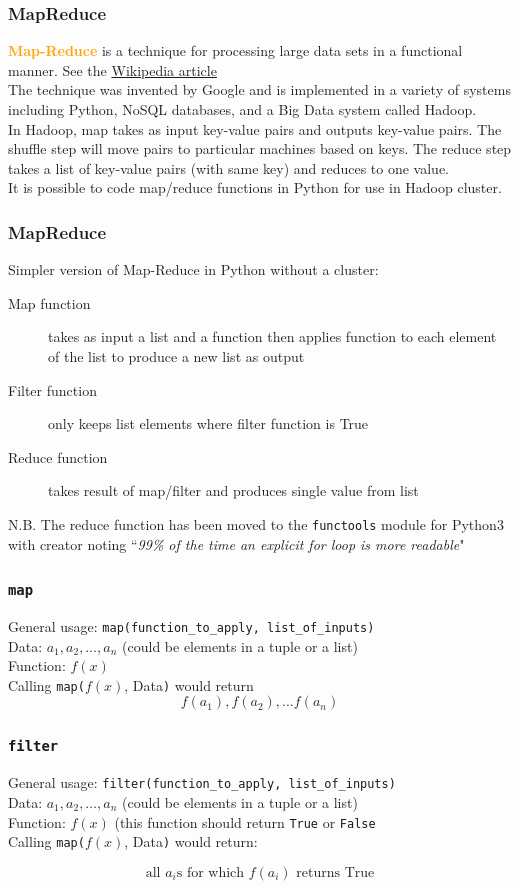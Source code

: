 \documentclass[xcolor=svgnames]{beamer}
\newcommand{\nl}{\\[1em]}
\newcommand{\define}[1]{\textbf{\textcolor{orange}{#1}}}
\newcommand{\ft}[1]{\frametitle{#1}}
\begin{document}
\begin{frame}[fragile]\ft{MapReduce}
\define{Map-Reduce} is a technique for processing large data sets in a functional manner. See the \href{https://en.wikipedia.org/wiki/MapReduce}{Wikipedia article}\nl
The technique was invented by Google and is implemented in a variety of systems including Python, NoSQL databases, and a Big Data system called Hadoop.\nl
In Hadoop, map takes as input key-value pairs and outputs key-value pairs.  The shuffle step will move pairs to particular machines based on keys.  The reduce step takes a list of key-value pairs (with same key) and reduces to one value.\nl
It is possible to code map/reduce functions in Python for use in Hadoop cluster.\nl
\end{frame}

\begin{frame}[fragile]\ft{MapReduce}
Simpler version of Map-Reduce in Python without a cluster:\nl
\begin{description}
\item[Map function] takes as input a list and a function then applies function to each element of the list to produce a new list as output
\item[Filter function]  only keeps list elements where filter function is True
\item[Reduce function] takes result of map/filter and produces single value from list
\end{description}
N.B. The  reduce function has been moved to the {\tt functools} module for Python3 with creator noting ``\textit{99\% of the time an explicit for loop is more readable}"
\end{frame}


\begin{frame}[fragile]\ft{\tt map}
General usage: \verb|map(function_to_apply, list_of_inputs)|\\[1em]

Data: $a_1, a_2, \dots, a_n$ (could be elements in a tuple or a list)\\
Function: $f(x)$\\[1em]

Calling {\tt map(}$f(x)$, Data{\tt )} would return 
$$f(a_1), f(a_2), \dots f(a_n)$$
\end{frame}


\begin{frame}[fragile]\ft{\tt filter}
General usage: \verb|filter(function_to_apply, list_of_inputs)|\\[1em]

Data: $a_1, a_2, \dots, a_n$ (could be elements in a tuple or a list)\\
Function: $f(x)$ (this function should return {\tt True} or {\tt False} \\[1em]

Calling {\tt map(}$f(x)$, Data{\tt )} would return:

$$\text{all } a_i \text{s for which }f(a_i) \text{ returns True} $$


\end{frame}
\end{document}
